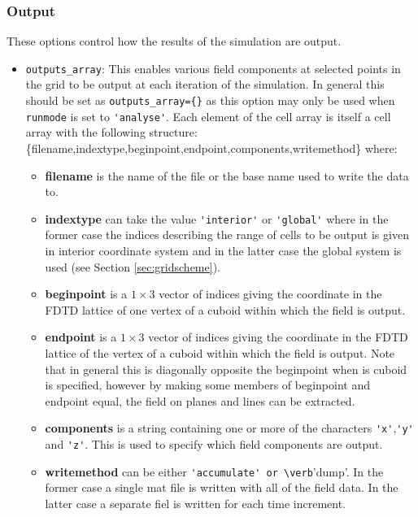 \documentclass[a4paper, 12pt]{article}
\begin{document}
	\subsubsection{Output}
	These options control how the results of the simulation are output.
	\begin{itemize}
		\item \verb+outputs_array+: This enables various field components at
		selected points in the grid to be output at each iteration of the
		simulation. In general this should be set as \verb+outputs_array={}+
		as this option may only be used when \verb+runmode+ is set to
		\verb+'analyse'+. Each element of the cell array is itself a cell
		array with the following structure:
		\{filename,indextype,beginpoint,endpoint,components,writemethod\}
		where:
		\begin{itemize}
			\item \textbf{filename} is the name of the file or the base name used to
			write the data to.
			\item \textbf{indextype} can take the value \verb+'interior'+ or \verb+'global'+
			where in the former case the indices describing the range of cells
			to be output is given in interior coordinate system and in the
			latter case the global system is used (see Section
			\ref{sec:gridscheme}).
			\item \textbf{beginpoint} is a $1\times 3$ vector of indices giving
			the coordinate in the FDTD lattice of one vertex of a cuboid within
			which the field is output.
			\item \textbf{endpoint} is a $1\times 3$ vector of indices giving
			the coordinate in the FDTD lattice of the vertex of a cuboid within
			which the field is output. Note that in general this is diagonally
			opposite the beginpoint when is cuboid is specified, however by
			making some members of beginpoint and endpoint equal, the field on
			planes and lines can be extracted.
			\item \textbf{components} is a string containing one or more of the
			characters \verb+'x'+,\verb+'y'+ and
			\verb+'z'+.
			This is used to specify which field components are output.
			\item \textbf{writemethod} can be either
			\verb+'accumulate' or \verb+'dump'. In the former case a single mat
			file is written with all of the field data. In the latter case a
			separate fiel is written for each time increment.
		\end{itemize}
		

\end{itemize}
\end{document}
